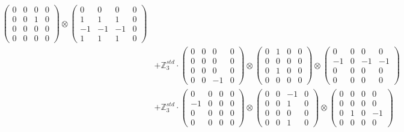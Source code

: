 \documentclass{article}
\begin{document}
{\begin{align}
            \begin{pmatrix} 0 & 0 & 0 & 0 \\ 0 & 0 & 1 & 0 \\ 0 & 0 & 0 & 0 \\ 0 & 0 & 0 & 0 \end{pmatrix} \otimes 
            \begin{pmatrix} 0 & 0 & 0 & 0 \\ 1 & 1 & 1 & 0 \\ -1 & -1 & -1 & 0 \\ 1 & 1 & 1 & 0 \end{pmatrix} \\ 
        &+ \label{Rs16-Rc11-Solution-29-c20} \mathbb{Z}_3^{std} \cdot 
            \begin{pmatrix} 0 & 0 & 0 & 0 \\ 0 & 0 & 0 & 0 \\ 0 & 0 & 0 & 0 \\ 0 & 0 & -1 & 0 \end{pmatrix} \otimes 
            \begin{pmatrix} 0 & 1 & 0 & 0 \\ 0 & 0 & 0 & 0 \\ 0 & 1 & 0 & 0 \\ 0 & 0 & 0 & 0 \end{pmatrix} \otimes 
            \begin{pmatrix} 0 & 0 & 0 & 0 \\ -1 & 0 & -1 & -1 \\ 0 & 0 & 0 & 0 \\ 0 & 0 & 0 & 0 \end{pmatrix} \\ 
        &+ \label{Rs16-Rc11-Solution-29-c21} \mathbb{Z}_3^{std} \cdot 
            \begin{pmatrix} 0 & 0 & 0 & 0 \\ -1 & 0 & 0 & 0 \\ 0 & 0 & 0 & 0 \\ 0 & 0 & 0 & 0 \end{pmatrix} \otimes 
            \begin{pmatrix} 0 & 0 & -1 & 0 \\ 0 & 0 & 1 & 0 \\ 0 & 0 & 0 & 0 \\ 0 & 0 & 1 & 0 \end{pmatrix} \otimes 
            \begin{pmatrix} 0 & 0 & 0 & 0 \\ 0 & 0 & 0 & 0 \\ 0 & 1 & 0 & -1 \\ 0 & 0 & 0 & 0 \end{pmatrix} \\ 

\end{align}}
\end{document}
